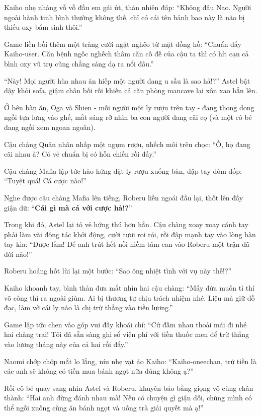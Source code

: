 \documentclass[../main.tex]{subfiles}
\begin{document}
Kaiho nhẹ nhàng vỗ vỗ đầu em gái út, thản nhiên đáp: ``Không đâu Nao. Người ngoài hành tinh bình thường không thế, chỉ có cái tên bảnh bao này là não bị thiếu oxy bẩm sinh thôi.''

Game liền bồi thêm một tràng cười ngặt nghẽo từ mặt đồng hồ: ``Chuẩn đấy Kaiho-user. Căn bệnh ngốc nghếch thâm căn cố đế của cậu ta thì có hít cạn cả bình oxy vũ trụ cũng chẳng sáng dạ ra nổi đâu.''

``Này! Mọi người hùa nhau ăn hiếp một người đang u sầu là sao hả!?'' Astel bật dậy khỏi sofa, giậm chân bối rối khiến cả căn phòng mancave lại xôn xao hẳn lên.

Ở bên bàn ăn, Oga và Shien - mỗi người một ly rượu trên tay - đang thong dong ngồi tựa lưng vào ghế, mắt sáng rỡ nhìn ba con người đang cãi cọ (và một cô bé đang ngồi xem ngoan ngoãn).

Cậu chàng Quân nhân nhấp một ngụm rượu, nhếch môi trêu chọc: ``Ồ, họ đang cãi nhau à? Có vẻ chuẩn bị có hỗn chiến rồi đấy.''

Cậu chàng Mafia lập tức hào hứng đặt ly rượu xuống bàn, đập tay đôm đốp: ``Tuyệt quá! Cá cược nào!''

Nghe được cậu chàng Mafia lên tiếng, Roberu liền ngoái đầu lại, thốt lên đầy giận dữ: ``\textbf{Cái gì mà cá với cược hả!?}''

Trong khi đó, Astel lại tỏ vẻ hứng thú hơn hẳn. Cậu chàng xoay xoay cánh tay phải làm vài động tác khởi động, cười tươi roi rói, rồi đập mạnh tay vào lòng bàn tay kia: ``Được lắm! Để anh trút hết nỗi niềm tâm can vào Roberu một trận đã đời nào!''


Roberu hoảng hốt lùi lại một bước: ``Sao ông nhiệt tình với vụ này thế!?''

Kaiho khoanh tay, bình thản đưa mắt nhìn hai cậu chàng: ``Mấy đứa muốn tỉ thí võ công thì ra ngoài giùm. Ai bị thương tự chịu trách nhiệm nhé. Liệu mà giữ đồ đạc, làm vỡ cái ly nào là chị trừ thẳng vào tiền lương.''

Game lập tức chen vào góp vui đầy khoái chí: ``Cứ đấm nhau thoải mái đi nhé hai chàng trai! Tôi đã sẵn sàng ghi sổ viện phí với tiền thuốc men để trừ thẳng vào lương tháng này của cả hai rồi đấy.''

Naomi chớp chớp mắt lo lắng, níu nhẹ vạt áo Kaiho: ``Kaiho-oneechan, trừ tiền là các anh sẽ không có tiền mua bánh ngọt nữa đúng không ạ?''

Rồi cô bé quay sang nhìn Astel và Roberu, khuyên bảo bằng giọng vô cùng chân thành: ``Hai anh đừng đánh nhau mà! Nếu có chuyện gì giận dỗi, chúng mình có thể ngồi xuống cùng ăn bánh ngọt và uống trà giải quyết mà ạ!''
\end{document}
